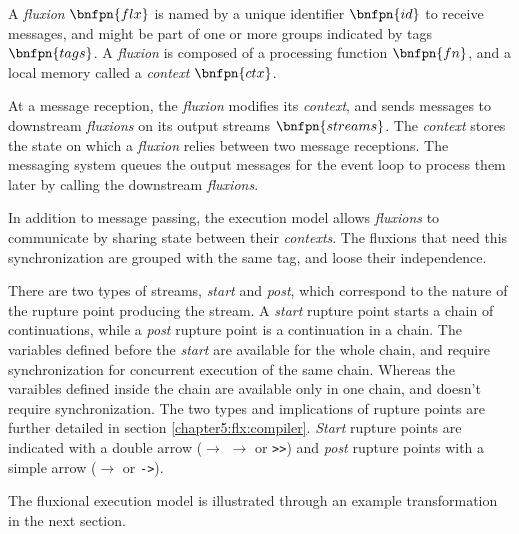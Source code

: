 
A \textit{fluxion} $\bnfpn{flx}$ is named by a unique identifier $\bnfpn{id}$ to receive messages, and might be part of one or more groups indicated by tags $\bnfpn{tags}$.
A \textit{fluxion} is composed of a processing function $\bnfpn{fn}$, and a local memory called a \textit{context} $\bnfpn{ctx}$.

At a message reception, the \textit{fluxion} modifies its \textit{context}, and sends messages to downstream \textit{fluxions} on its output streams $\bnfpn{streams}$.
The \textit{context} stores the state on which a \textit{fluxion} relies between two message receptions.
The messaging system queues the output messages for the event loop to process them later by calling the downstream \textit{fluxions}.

In addition to message passing, the execution model allows \textit{fluxions} to communicate by sharing state between their \textit{contexts}.
The fluxions that need this synchronization are grouped with the same tag, and loose their independence.

There are two types of streams, \textit{start} and \textit{post}, which correspond to the nature of the rupture point producing the stream.
A \textit{start} rupture point starts a chain of continuations, while a \textit{post} rupture point is a continuation in a chain.
The variables defined before the \textit{start} are available for the whole chain, and require synchronization for concurrent execution of the same chain.
Whereas the varaibles defined inside the chain are available only in one chain, and doesn't require synchronization.
The two types and implications of rupture points are further detailed in section \ref{chapter5:flx:compiler}.
\textit{Start} rupture points are indicated with a double arrow ($\to$ \hspace{-1.4em} $\to$ or \texttt{>>}) and \textit{post} rupture points with a simple arrow ($\to$ or \texttt{->}).

The fluxional execution model is illustrated through an example transformation in the next section.